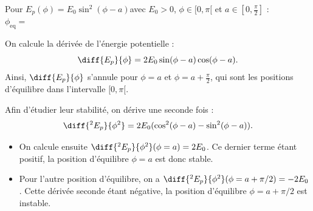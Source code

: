 
\begin{enonce}
Pour $E_p(\phi) = E_0\sin^2(\phi-a)$\quad  avec $E_0>0$, $\phi\in[0,\pi[$ et  $a\in\left[0,\frac{\pi}{2}\right]$ : \minusBigskip \\
$\phi_{\textrm{eq}} = $
\end{enonce}


\begin{corrige}
On calcule la dérivée de l'énergie potentielle :
\[
\diff{E_p}{\phi} =2E_0\sin(\phi-a)\cos(\phi-a).
\]
Ainsi, $\diff{E_p}{\phi}$ s'annule pour $\phi=a$ et $\phi=a+\frac{\pi}{2}$, qui sont les positions d'équilibre dans l'intervalle $[0,\pi[$. 

Afin d'étudier leur stabilité, on dérive une seconde fois :
\[
\diff{^2E_p}{\phi^2}=2E_0(\cos^2(\phi-a)-\sin^2(\phi-a)).
\]

\begin{itemize}
\item
On calcule ensuite $\diff{^2E_p}{\phi^2}(\phi=a) = 2E_0$.
Ce dernier terme étant positif, la position d'équilibre $\phi=a$ est donc stable.

\item
Pour l'autre position d'équilibre, on a $\diff{^2E_p}{\phi^2}(\phi=a+\pi/2) = -2E_0$.
Cette dérivée seconde étant négative, la position d'équilibre $\phi=a+\pi/2$ est instable.
\end{itemize}
\end{corrige}


\finEntrainement





\hauteurLargeurCadreReponse		{6mm}{2cm}
\initialisationEntrainement

